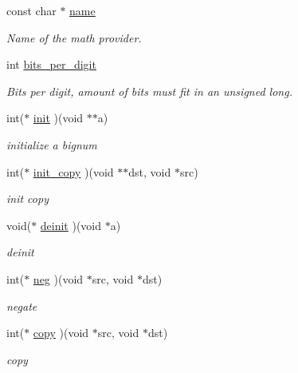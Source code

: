 \begin{DoxyCompactItemize}
\item 
const char $\ast$ \mbox{\hyperlink{structltc__math__descriptor_a8838126de4a27e382f91096e369a2728}{name}}
\begin{DoxyCompactList}\small\item\em Name of the math provider. \end{DoxyCompactList}\item 
int \mbox{\hyperlink{structltc__math__descriptor_a0cea337ac807728b20f2b980788b3078}{bits\+\_\+per\+\_\+digit}}
\begin{DoxyCompactList}\small\item\em Bits per digit, amount of bits must fit in an unsigned long. \end{DoxyCompactList}\item 
int($\ast$ \mbox{\hyperlink{structltc__math__descriptor_a0663bfda2c6b628f94df2aa82142f921}{init}} )(void $\ast$$\ast$a)
\begin{DoxyCompactList}\small\item\em initialize a bignum \end{DoxyCompactList}\item 
int($\ast$ \mbox{\hyperlink{structltc__math__descriptor_ab37507025ee53d5ad903a4b8b8c2f1db}{init\+\_\+copy}} )(void $\ast$$\ast$dst, void $\ast$src)
\begin{DoxyCompactList}\small\item\em init copy \end{DoxyCompactList}\item 
void($\ast$ \mbox{\hyperlink{structltc__math__descriptor_aacc2306d4534b21b76ddd11b54274f31}{deinit}} )(void $\ast$a)
\begin{DoxyCompactList}\small\item\em deinit \end{DoxyCompactList}\item 
int($\ast$ \mbox{\hyperlink{structltc__math__descriptor_a5a6883b492216ee9047c10ce733b80b5}{neg}} )(void $\ast$src, void $\ast$dst)
\begin{DoxyCompactList}\small\item\em negate \end{DoxyCompactList}\item 
int($\ast$ \mbox{\hyperlink{structltc__math__descriptor_a1f4a910f2a962c70c7ef7dae0bc84eef}{copy}} )(void $\ast$src, void $\ast$dst)
\begin{DoxyCompactList}\small\item\em copy \end{DoxyCompactList}\item 

\end{DoxyCompactItemize}
